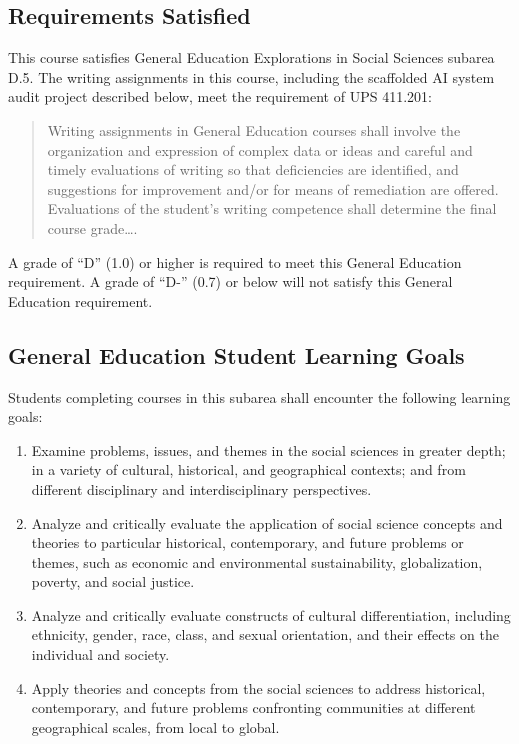 \documentclass[12pt]{article}
\begin{document}
\subsection*{Requirements Satisfied}
This course satisfies General Education Explorations in Social Sciences subarea D.5. The writing assignments in this course, including the scaffolded AI system audit project described below, meet the requirement of UPS 411.201:
\begin{quote}Writing assignments in General Education courses shall involve the organization and expression of complex data or ideas and careful and timely evaluations of writing so that deficiencies are identified, and suggestions for improvement and/or for means of remediation are offered. Evaluations of the student's writing competence shall determine the final course grade\ldots .\end{quote}
A grade of ``D'' (1.0) or higher is required to meet this General Education requirement. A grade of ``D-'' (0.7) or below will not satisfy this General Education requirement.
\subsection*{General Education Student Learning Goals}
Students completing courses in this subarea shall encounter the following learning goals:
\begin{enumerate}
    \item Examine problems, issues, and themes in the social sciences in greater depth; in a variety of cultural, historical, and geographical contexts; and from different disciplinary and interdisciplinary perspectives.
    \item Analyze and critically evaluate the application of social science concepts and theories to particular historical, contemporary, and future problems or themes, such as economic and environmental sustainability, globalization, poverty, and social justice.
    \item Analyze and critically evaluate constructs of cultural differentiation, including ethnicity, gender, race, class, and sexual orientation, and their effects on the individual and society.
    \item Apply theories and concepts from the social sciences to address historical, contemporary, and future problems confronting communities at different geographical scales, from local to global.
\end{enumerate}

\end{document}
